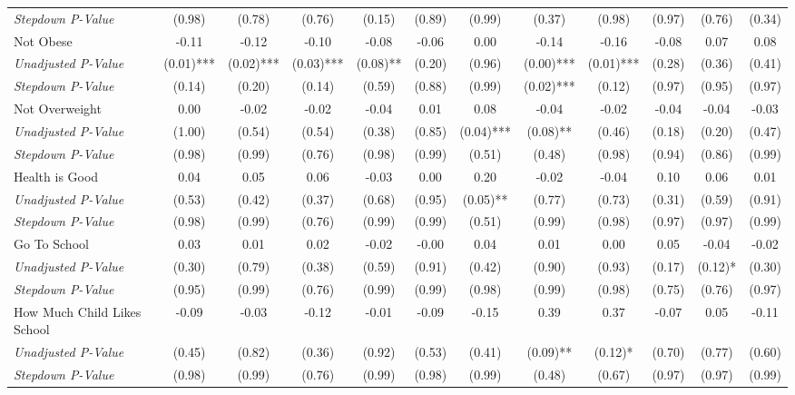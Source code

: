 \begin{tabular}{l c c c c c c c c c c c}
\quad \textit{Stepdown P-Value} & (0.98) & (0.78) & (0.76) & (0.15) & (0.89) & (0.99) & (0.37) & (0.98) & (0.97) & (0.76) & (0.34) \\
Not Obese & -0.11 & -0.12 & -0.10 & -0.08 & -0.06 & 0.00 & -0.14 & -0.16 & -0.08 & 0.07 & 0.08 \\
\quad \textit{Unadjusted P-Value} & (0.01)*** & (0.02)*** & (0.03)*** & (0.08)** & (0.20) & (0.96) & (0.00)*** & (0.01)*** & (0.28) & (0.36) & (0.41) \\
\quad \textit{Stepdown P-Value} & (0.14) & (0.20) & (0.14) & (0.59) & (0.88) & (0.99) & (0.02)*** & (0.12) & (0.97) & (0.95) & (0.97) \\
Not Overweight & 0.00 & -0.02 & -0.02 & -0.04 & 0.01 & 0.08 & -0.04 & -0.02 & -0.04 & -0.04 & -0.03 \\
\quad \textit{Unadjusted P-Value} & (1.00) & (0.54) & (0.54) & (0.38) & (0.85) & (0.04)*** & (0.08)** & (0.46) & (0.18) & (0.20) & (0.47) \\
\quad \textit{Stepdown P-Value} & (0.98) & (0.99) & (0.76) & (0.98) & (0.99) & (0.51) & (0.48) & (0.98) & (0.94) & (0.86) & (0.99) \\
Health is Good & 0.04 & 0.05 & 0.06 & -0.03 & 0.00 & 0.20 & -0.02 & -0.04 & 0.10 & 0.06 & 0.01 \\
\quad \textit{Unadjusted P-Value} & (0.53) & (0.42) & (0.37) & (0.68) & (0.95) & (0.05)** & (0.77) & (0.73) & (0.31) & (0.59) & (0.91) \\
\quad \textit{Stepdown P-Value} & (0.98) & (0.99) & (0.76) & (0.99) & (0.99) & (0.51) & (0.99) & (0.98) & (0.97) & (0.97) & (0.99) \\
Go To School & 0.03 & 0.01 & 0.02 & -0.02 & -0.00 & 0.04 & 0.01 & 0.00 & 0.05 & -0.04 & -0.02 \\
\quad \textit{Unadjusted P-Value} & (0.30) & (0.79) & (0.38) & (0.59) & (0.91) & (0.42) & (0.90) & (0.93) & (0.17) & (0.12)* & (0.30) \\
\quad \textit{Stepdown P-Value} & (0.95) & (0.99) & (0.76) & (0.99) & (0.99) & (0.98) & (0.99) & (0.98) & (0.75) & (0.76) & (0.97) \\
How Much Child Likes School & -0.09 & -0.03 & -0.12 & -0.01 & -0.09 & -0.15 & 0.39 & 0.37 & -0.07 & 0.05 & -0.11 \\
\quad \textit{Unadjusted P-Value} & (0.45) & (0.82) & (0.36) & (0.92) & (0.53) & (0.41) & (0.09)** & (0.12)* & (0.70) & (0.77) & (0.60) \\
\quad \textit{Stepdown P-Value} & (0.98) & (0.99) & (0.76) & (0.99) & (0.98) & (0.99) & (0.48) & (0.67) & (0.97) & (0.97) & (0.99) \\

\end{tabular}
